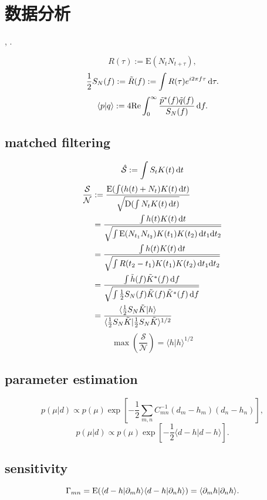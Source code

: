 \chapter{数据分析}

\cite{Finn1992}, \cite{Maggiore2014}.

\def\la{\langle}
\def\ra{\rangle}
\begin{equation}
    R(\tau):=\text{E}(N_tN_{t+\tau}),
\end{equation}
\begin{equation}
    \frac{1}{2}S_{N}(f):=\tilde{R}(f):=\int R(\tau)e^{i2\pi f\tau}\,\mathrm{d}\tau.
\end{equation}
\begin{equation}
    \la p|q \ra:=4\text{Re}\int_0^\infty\frac{\tilde{p}^*(f)\tilde{q}(f)}{S_{N}(f)}\,\d f.
\end{equation}

\section{matched filtering}

\begin{equation}
    \hat{\mathcal{S}}:=\int S_tK(t)\,\mathrm{d} t
\end{equation}
\begin{align}
    \frac{\mathcal{S}}{\mathcal{N}}&:=\frac{\text{E}(\int (h(t)+N_t)K(t)\,\d t)}{\sqrt{\text{D}(\int N_tK(t)\,\d t)}}\\
    &=\frac{\int h(t)K(t)\,\d t}{\sqrt{\int \text{E}(N_{t_1}N_{t_2})K(t_1)K(t_2)\,\d t_1\d t_2}}\\
    &=\frac{\int h(t)K(t)\,\d t}{\sqrt{\int R(t_2-t_1)K(t_1)K(t_2)\,\d t_1\d t_2}}\\
    &=\frac{\int \ti{h}(f)\ti{K}^*(f)\,\d f}{\sqrt{\int\frac{1}{2}S_{N}(f)\ti{K}(f)\ti{K}^*(f)\,\d f}}\\
    &=\frac{\la \frac{1}{2}S_{N}\ti{K}|h \ra}{\la \frac{1}{2}S_{N}\ti{K}|\frac{1}{2}S_{N}\ti{K} \ra^{1/2}}
\end{align}
\begin{equation}
    \max{(\frac{\mathcal{S}}{\mathcal{N}})}=\la h|h \ra^{1/2}
\end{equation}

\section{parameter estimation}

\begin{equation}
    p(\mu|d)\propto p(\mu)\exp\left[-\frac{1}{2}\sum_{m,n}C_{mn}^{-1}(d_m-h_m)(d_n-h_n)\right],
\end{equation}
\begin{equation}
    p(\mu|d)\propto p(\mu)\exp\left[-\frac{1}{2}\la d-h|d-h \ra\right].
\end{equation}

\section{sensitivity}

\begin{equation}
    \Gamma_{mn}=\text{E}(\la d-h|\p_m h\ra\la d-h|\p_n h \ra)=\la \p_m h|\p_n h \ra.
\end{equation}
